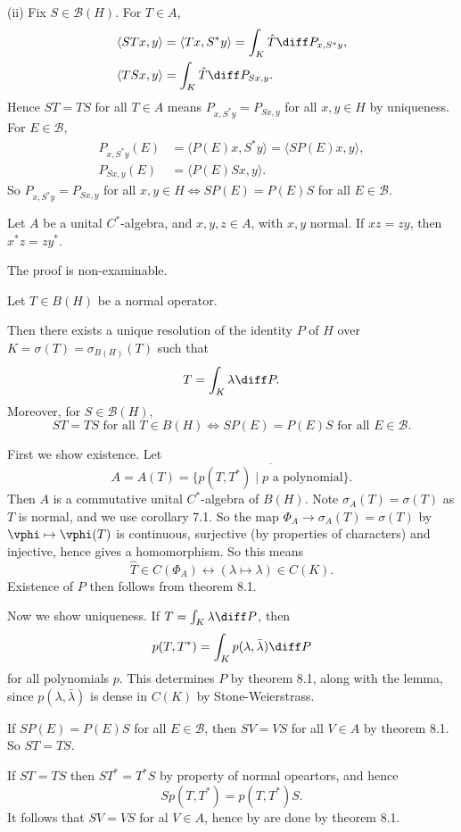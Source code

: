 \documentclass[12pt]{article}
\begin{document}
\begin{proofbox}
	(ii) Fix $S \in \mathcal{B}(H)$. For $T \in A$,
	\begin{align*}
		\langle ST x, y\rangle &= \langle Tx, S^{\ast} y \rangle = \int_K \hat T \diff P_{x, S^{\ast} y}, \\
		\langle TS x, y \rangle &= \int_K \hat T \diff P_{Sx, y}.
	\end{align*}
	Hence $ST = TS$ for all $T \in A$ means $P_{x, S^{\ast} y} = P_{Sx, y}$ for all $x, y \in H$ by uniqueness. For $E \in \mathcal{B}$,
	\begin{align*}
		P_{x, S^{\ast} y}(E) &= \langle P(E) x, S^{\ast} y \rangle = \langle SP(E) x, y \rangle, \\
		P_{Sx, y}(E) &= \langle P(E)Sx, y\rangle.
	\end{align*}
	So $P_{x, S^{\ast} y} = P_{Sx, y}$ for all $x, y \in H \iff SP(E) = P(E)S$ for all $E \in \mathcal{B}$.
\end{proofbox}

\begin{lemma}
	Let $A$ be a unital $C^{\ast}$-algebra, and $x, y, z \in A$, with $x, y$ normal. If $xz = zy$, then $x^{\ast} z = z y^{\ast}$.
\end{lemma}

The proof is non-examinable.

\begin{theorem}
	Let $T \in B(H)$ be a normal operator.

	Then there exists a unique resolution of the identity $P$ of $H$ over $K = \sigma(T) = \sigma_{B(H)}(T)$ such that
	\[
	T = \int_K \lambda \diff P.
	\]
	Moreover, for $S \in \mathcal{B}(H)$,
	\[
		ST = TS \text{ for all } T \in B(H) \iff SP(E) = P(E)S \text{ for all } E \in \mathcal{B}.
	\]
\end{theorem}

\begin{proofbox}
	First we show existence. Let
	\[
		A = A(T) = \overline{\{p(T, T^{\ast}) \mid p \text{ a polynomial}\}}.
	\]
	Then $A$ is a commutative unital $C^{\ast}$-algebra of $B(H)$. Note $\sigma_A(T) = \sigma(T)$ as $T$ is normal, and we use corollary 7.1. So the map $\Phi_A \to \sigma_A(T) = \sigma(T)$ by $\vphi \mapsto \vphi(T)$ is continuous, surjective (by properties of characters) and injective, hence gives a homomorphism. So this means
	\[
	\hat T \in C(\Phi_A) \leftrightarrow (\lambda \mapsto \lambda) \in C(K).
	\]
	Existence of $P$ then follows from theorem 8.1.

	Now we show uniqueness. If $T = \int_K \lambda \diff P$, then
	\[
	p(T, T^{\ast}) = \int_K p(\lambda, \bar \lambda) \diff P
	\]
	for all polynomials $p$. This determines $P$ by theorem 8.1, along with the lemma, since $p(\lambda, \bar \lambda)$ is dense in $C(K)$ by Stone-Weierstrass.

	If $SP(E) = P(E)S$ for all $E \in \mathcal{B}$, then $ SV = VS$ for all $V \in A$ by theorem 8.1. So $ST = TS$.

	If $ST = TS$ then $ST^{\ast} = T^{\ast} S$ by property of normal opeartors, and hence
	\[
	S p(T,T^{\ast}) = p(T, T^{\ast}) S.
	\]
	It follows that $SV = VS$ for al $V \in A$, hence by are done by theorem 8.1.
\end{proofbox}
\end{document}
